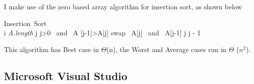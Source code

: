 \documentclass[a4paper]{article}
\begin{document}
I make use of the zero based array algorithm for insertion sort, as shown below

\begin{program}
\mbox{Insertion Sort}
\BEGIN \\ %
  \FOR i  \TO \textit{A.length}  \DO
     j 
\WHILE j>0 \ and \ A [j-1]>A[j]
swap \ A[j] \ and \ A[j-1]
        j \gets j - 1
        \END
\END
\end{program}

This algorithm has Best case in $\Theta$(n), the Worst and Average cases run in $\Theta$ ($n^{2}$). 

\subsection{Microsoft Visual Studio}
\end{document}
